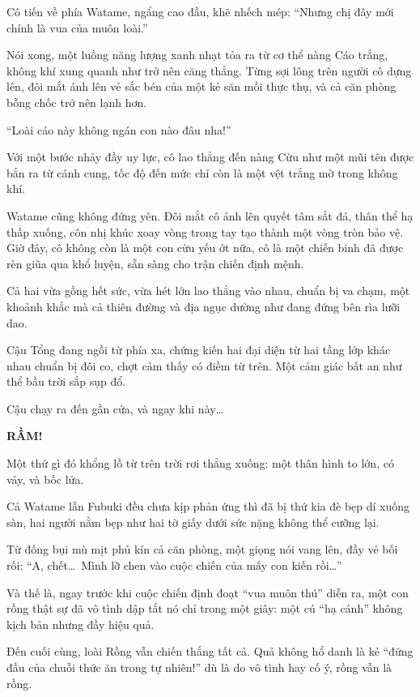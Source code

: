 \documentclass[../main.tex]{subfiles}
\begin{document}
Cô tiến về phía Watame, ngẩng cao đầu, khẽ nhếch mép: ``Nhưng chị đây mới chính là vua của muôn loài.''

Nói xong, một luồng năng lượng xanh nhạt tỏa ra từ cơ thể nàng Cáo trắng, không khí xung quanh như trở nên căng thẳng. Từng sợi lông trên người cô dựng lên, đôi mắt ánh lên vẻ sắc bén của một kẻ săn mồi thực thụ, và cả căn phòng bỗng chốc trở nên lạnh hơn.

``Loài cáo này không ngán con nào đâu nha!''

Với một bước nhảy đầy uy lực, cô lao thẳng đến nàng Cừu như một mũi tên được bắn ra từ cánh cung, tốc độ đến mức chỉ còn là một vệt trắng mờ trong không khí.

Watame cũng không đứng yên. Đôi mắt cô ánh lên quyết tâm sắt đá, thân thể hạ thấp xuống, côn nhị khúc xoay vòng trong tay tạo thành một vòng tròn bảo vệ. Giờ đây, cô không còn là một con cừu yếu ớt nữa, cô là một chiến binh đã được rèn giũa qua khổ luyện, sẵn sàng cho trận chiến định mệnh.


Cả hai vừa gồng hết sức, vừa hét lớn lao thẳng vào nhau, chuẩn bị va chạm, một khoảnh khắc mà cả thiên đường và địa ngục dường như đang đứng bên rìa lưỡi dao.

Cậu Tổng đang ngồi từ phía xa, chứng kiến hai đại diện từ hai tầng lớp khác nhau chuẩn bị đôi co, chợt cảm thấy có điềm từ trên. Một cảm giác bất an như thể bầu trời sắp sụp đổ.

Cậu chạy ra đến gần cửa, và ngay khi này\dots

\textbf{RẦM!}

Một thứ gì đó khổng lồ từ trên trời rơi thẳng xuống: một thân hình to lớn, có vảy, và bốc lửa.

Cả Watame lẫn Fubuki đều chưa kịp phản ứng thì đã bị thứ kia đè bẹp dí xuống sàn, hai người nằm bẹp như hai tờ giấy dưới sức nặng không thể cưỡng lại.

Từ đống bụi mù mịt phủ kín cả căn phòng, một giọng nói vang lên, đầy vẻ bối rối: ``A, chết\dots\ Mình lỡ chen vào cuộc chiến của mấy con kiến rồi\dots''


Và thế là, ngay trước khi cuộc chiến định đoạt ``vua muôn thú'' diễn ra, một con rồng thật sự đã vô tình dập tắt nó chỉ trong một giây: một cú ``hạ cánh'' không kịch bản nhưng đầy hiệu quả.

Đến cuối cùng, loài Rồng vẫn chiến thắng tất cả. Quả không hổ danh là kẻ ``đứng đầu của chuỗi thức ăn trong tự nhiên!'' dù là do vô tình hay cố ý, rồng vẫn là rồng.
\end{document}
